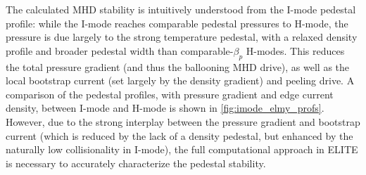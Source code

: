 The calculated MHD stability is intuitively understood from the I-mode pedestal profile: while the I-mode reaches comparable pedestal pressures to H-mode, the pressure is due largely to the strong temperature pedestal, with a relaxed density profile and broader pedestal width than comparable-$\beta_p$ H-modes.  This reduces the total pressure gradient (and thus the ballooning MHD drive), as well as the local bootstrap current (set largely by the density gradient) and peeling drive.  A comparison of the pedestal profiles, with pressure gradient and edge current density, between I-mode and H-mode is shown in \cref{fig:imode_elmy_profs}.  However, due to the strong interplay between the pressure gradient and bootstrap current (which is reduced by the lack of a density pedestal, but enhanced by the naturally low collisionality in I-mode), the full computational approach in ELITE is necessary to accurately characterize the pedestal stability.

